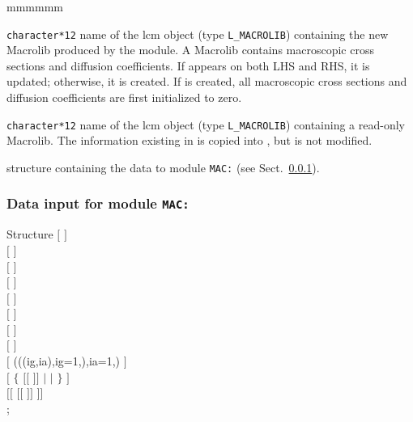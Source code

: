 \begin{ListeDeDescription}{mmmmmm}

\item[\dusa{MACR1}] {\tt character*12} name of the {\sc lcm} object (type {\tt L\_MACROLIB}) containing the new Macrolib
produced by the module. A Macrolib contains macroscopic cross sections and diffusion coefficients.
If  appears on both LHS and RHS, it is updated; otherwise, it is
created. If  is created, all macroscopic cross sections and
diffusion coefficients are first initialized to zero.

\item[\dusa{MACR2}] {\tt character*12} name of the {\sc lcm} object (type {\tt L\_MACROLIB}) containing a read-only
Macrolib. The information existing in  is copied into , but  is not modified.

\item[\dstr{mac\_data}] structure containing the data to module {\tt MAC:} (see Sect.~\ref{sect:mac_data}).

\end{ListeDeDescription}

\vskip 0.2cm

\subsubsection{Data input for module {\tt MAC:}}\label{sect:mac_data}

\begin{DataStructure}{Structure }
$[$   $]$ \\
$[$   $]$ \\
$[$   $]$ \\
$[$   $]$ \\
$[$   $]$ \\
$[$   $]$ \\
$[$   $]$ \\
$[$   $]$ \\
$[$   (((ig,ia),ig=1,),ia=1,) $]$ \\
$[$   $\{$ $[[$  $]]$ $|$   $|$   $\}$ $]$ \\
$[[$     $[[$  $]]$ $]]$ \\
;
\end{DataStructure}

